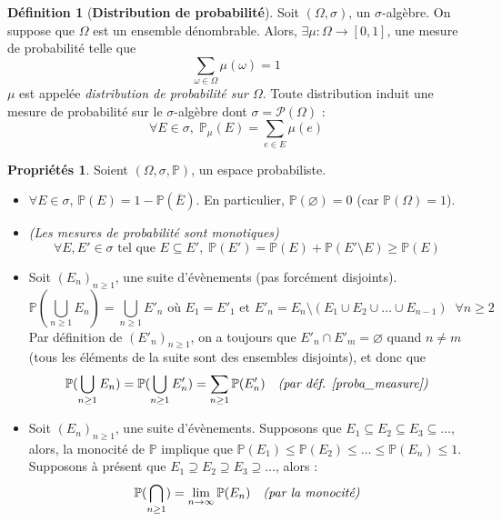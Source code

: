 \documentclass[12pt,a4paper]{report}
\theoremstyle{definition}%
\newtheorem{definition}{Définition}[chapter]
\newtheorem*{proprietes}{Propriétés}
\theoremstyle{remark}
\let\labelitemi\labelitemii
\begin{document}
\begin{definition}[\textbf{Distribution de probabilité}]
	Soit $(\Omega, \sigma)$, un $\sigma$-algèbre. 
	On suppose que $\Omega$ est un ensemble dénombrable. Alors, $\exists \mu: \Omega \rightarrow [0,1]$, une mesure de probabilité telle que 
	\[\sum_{\omega \in \Omega} \mu(\omega) =1 \]
	$\mu$ est appelée \textit{distribution de probabilité sur $\Omega$}. Toute distribution induit une mesure de probabilité sur le $\sigma$-algèbre dont $\sigma = \mathcal{P}(\Omega)$ :
	\[ \forall E \in \sigma,\; \mathbb{P}_{\mu}(E) = \sum_{e \in E} \mu(e)\]
\end{definition}

\begin{proprietes}
	Soient $(\Omega, \sigma, \mathbb{P})$, un espace probabiliste.
	
	\begin{itemize}
		\renewcommand{\labelitemi}{\tiny$\bullet$}
		\item $\forall E \in \sigma$, $\mathbb{P}(E) = 1 - \mathbb{P}(\overline{E})$. En particulier, $\mathbb{P}(\varnothing) = 0$ (car $\mathbb{P}(\Omega) = 1$).
		\item \textit{(Les mesures de probabilité sont monotiques)} \[\forall E, E' \in \sigma \text{ tel que } E \subseteq E',\; \mathbb{P}(E') = \mathbb{P}(E) + \mathbb{P}(E' \setminus E) \geq \mathbb{P}(E)\]
		\item Soit $(E_n)_{n \geq 1}$, une suite d'évènements (pas forcément disjoints). \[\mathbb{P}(\bigcup_{n \geq 1} E_n) = \bigcup_{n \geq 1} E'_n \text{ où }E_1 = E'_1\text{ et }E'_n = E_n \setminus (E_1 \cup E_2 \cup \dots \cup E_{n-1}) \;\; \forall n \geq 2\]
		Par définition de $(E'_n)_{n \geq 1}$, on a toujours que $E'_n \cap E'_m = \varnothing$ quand $n \neq m$ (tous les éléments de la suite sont des ensembles disjoints), et donc que
		\[ \mathbb{P}(\bigcup_{n \geq 1} E_n) =  \mathbb{P}(\bigcup_{n \geq 1} E'_n) = \sum_{n \geq 1}\mathbb{P}(E'_n) \quad \text{\textit{(par déf. \ref{proba_measure})}}\]
		\item Soit $(E_n)_{n \geq 1}$, une suite d'évènements. Supposons que $E_1 \subseteq E_2 \subseteq E_3 \subseteq \dots $, alors, la monocité de $\mathbb{P}$ implique que $\mathbb{P}(E_1) \leq \mathbb{P}(E_2) \leq \dots \leq \mathbb{P}(E_n) \leq 1$.
		Supposons à présent que $E_1 \supseteq E_2 \supseteq E_3 \supseteq \dots$, alors :
		\[ \mathbb{P}(\bigcap_{n \geq 1}) = \lim_{n \rightarrow \infty} \mathbb{P}(E_n) \quad \text{\textit{(par la monocité)}}\]
	\end{itemize}
\end{proprietes}
\end{document}
